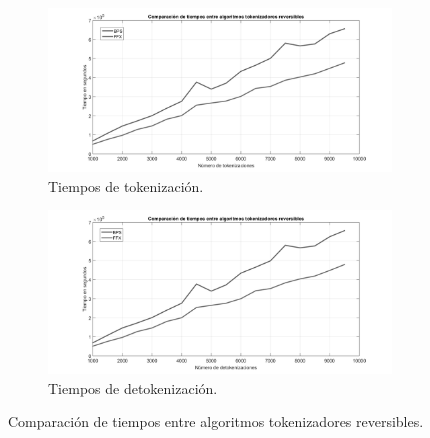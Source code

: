 \begin{figure}
  \centering
  \begin{subfigure}{1\textwidth}
    \begin{center}
      \includegraphics[width=1\linewidth]
        {../../../../../diagramas_comunes/desempenio/tok_rev_bn}
      \caption{Tiempos de tokenización.}
    \end{center}
  \end{subfigure}
  \begin{subfigure}{0.9\textwidth}
    \begin{center}
      \includegraphics[width=1\linewidth]{diagramas/detok_rev_bn}
      \caption{Tiempos de detokenización.}
    \end{center}
  \end{subfigure}
  \caption{Comparación de tiempos entre algoritmos tokenizadores reversibles.}
  \label{figura:tok_rev}
\end{figure}

